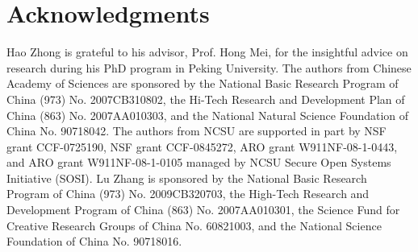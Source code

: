 \documentclass{sig-alternate}
\begin{document}
\section*{Acknowledgments}
Hao Zhong is grateful to his advisor, Prof. Hong Mei, for the insightful advice on research during 
his PhD program in Peking University. The authors from Chinese Academy of Sciences are sponsored by the National Basic Research Program of China (973) No. 2007CB310802, the Hi-Tech Research and Development Plan of China (863) No. 2007AA010303, and the National Natural Science Foundation of China No. 90718042. The authors from NCSU are supported in part by NSF grant CCF-0725190, NSF grant CCF-0845272, ARO grant W911NF-08-1-0443, and ARO grant W911NF-08-1-0105 managed by NCSU Secure Open Systems Initiative (SOSI). Lu Zhang is sponsored by the National Basic Research Program of China (973) No. 2009CB320703, the High-Tech Research and Development Program of China (863) No. 2007AA010301, the Science Fund for Creative Research Groups of China No. 60821003, and the National Science Foundation of China No. 90718016.
%


%
%

\end{document}
